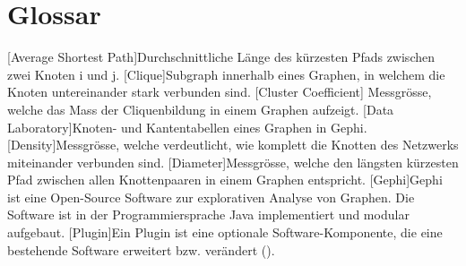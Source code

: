 \chapter*{Glossar}

\begin{acronym}
    [Average Shortest Path]{Durchschnittliche Länge des kürzesten Pfads zwischen zwei Knoten i und j.}
    [Clique]{Subgraph innerhalb eines Graphen, in welchem die Knoten untereinander stark verbunden sind.}
    [Cluster Coefficient] Messgrösse, welche das Mass der Cliquenbildung in einem Graphen aufzeigt.
    [Data Laboratory]{Knoten- und Kantentabellen eines Graphen in Gephi.}
    [Density]{Messgrösse, welche verdeutlicht, wie komplett die Knotten des Netzwerks miteinander verbunden sind.}
    [Diameter]{Messgrösse, welche den längsten kürzesten Pfad zwischen allen Knottenpaaren in einem Graphen entspricht.}
    [Gephi]{Gephi ist eine Open-Source Software zur explorativen
    Analyse von Graphen. Die Software ist in der Programmiersprache Java implementiert
    und modular aufgebaut.}
    [Plugin]{Ein Plugin ist eine optionale Software-Komponente, die eine bestehende Software erweitert bzw. verändert (\cite{noauthor_plug-_2019}).}
\end{acronym}
